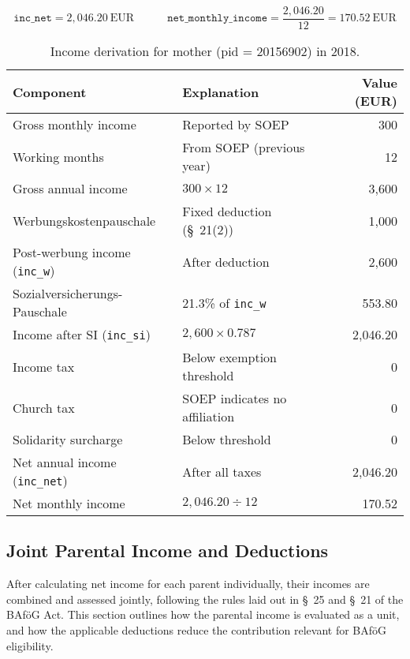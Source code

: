 \[
\texttt{inc\_net} = 2{,}046.20~\text{EUR}
\qquad\quad
\texttt{net\_monthly\_income} = \frac{2{,}046.20}{12} = 170.52~\text{EUR}
\]

\begin{table}[H]
\footnotesize
\centering
\begin{tabularx}{\textwidth}{lXr}
\toprule
\textbf{Component} & \textbf{Explanation} & \textbf{Value (EUR)} \\
\midrule
Gross monthly income & Reported by SOEP & 300 \\
Working months & From SOEP (previous year) & 12 \\
Gross annual income & $300 \times 12$ & 3,600 \\
Werbungskostenpauschale & Fixed deduction (§~21(2)) & 1,000 \\
Post-werbung income (\texttt{inc\_w}) & After deduction & 2,600 \\
Sozialversicherungs-Pauschale & 21.3\% of \texttt{inc\_w} & 553.80 \\
Income after SI (\texttt{inc\_si}) & $2{,}600 \times 0.787$ & 2,046.20 \\
Income tax & Below exemption threshold & 0 \\
Church tax & SOEP indicates no affiliation & 0 \\
Solidarity surcharge & Below threshold & 0 \\
Net annual income (\texttt{inc\_net}) & After all taxes & 2,046.20 \\
Net monthly income & $2{,}046.20 \div 12$ & 170.52 \\
\bottomrule
\end{tabularx}
\caption{Income derivation for mother (pid = 20156902) in 2018.}
\label{table:bafoeg_parent_mother}
\end{table}


\subsection{Joint Parental Income and Deductions}

After calculating net income for each parent individually, their incomes are combined and assessed jointly, following the rules laid out in §~25 and §~21 of the BAföG Act. This section outlines how the parental income is evaluated as a unit, and how the applicable deductions reduce the contribution relevant for BAföG eligibility.

